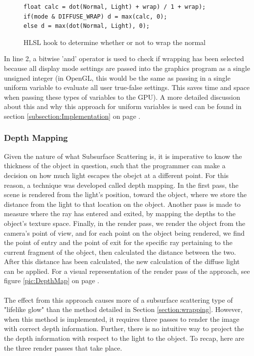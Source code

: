 \documentclass[a4paper, 12pt]{article}
\begin{document}
\begin{figure}[h]
\begin{lstlisting}[breaklines, language=HLSL]
float calc = dot(Normal, Light) + wrap) / 1 + wrap);
if(mode & DIFFUSE_WRAP) d = max(calc, 0);
else d = max(dot(Normal, Light), 0);
\end{lstlisting}

\caption{HLSL hook to determine whether or not to wrap the normal}
\label{code:WrapExample}
\end{figure}

\noindent In line 2, a bitwise 'and' operator is used to check if wrapping has
been selected because all display mode settings are passed into the graphics
program as a single unsigned integer (in OpenGL, this would be the same as
passing in a single uniform variable to evaluate all user true-false settings.
This saves time and space when passing these types of variables to the GPU). A
more detailed discussion about this and why this approach for uniform
variables is used can be found in section \ref{subsection:Implementation} on
page \pageref{subsection:Implementation}.

\subsubsection{Depth Mapping} 
\label{section:DepthMap}

Given the nature of what Subsurface Scattering is, it is imperative to know
the thickness of the object in question, such that the programmer can make a
decision on how much light escapes the obejct at a different point. For this
reason, a technique was developed called depth mapping. In the first pass, the
scene is rendered from the light's position, toward the object, where we store
the distance from the light to that location on the object. Another pass is
made to measure where the ray has entered and exited, by mapping the depths to
the object's texture space. Finally, in the render pass, we render the object
from the camera's point of view, and for each point on the object being
rendered, we find the point of entry and the point of exit for the specific
ray pertaining to the current fragment of the object, then calculated the
distance between the two. After this distance has been calculated, the new
calculation of the diffuse light can be applied. For a visual representation
of the render pass of the approach, see figure \ref{pic:DepthMap} on page
\pageref{pic:DepthMap}. \\ \\ The effect from this approach causes more of a
subsurface scattering type of "lifelike glow" than the method detailed in
Section \ref{section:wrapping}. However, when this method is implemented, it
requires three passes to render the image with correct depth information.
Further, there is no intuitive way to project the the depth information with
respect to the light to the object. To recap, here are the three render passes
that take place.
\end{document}
